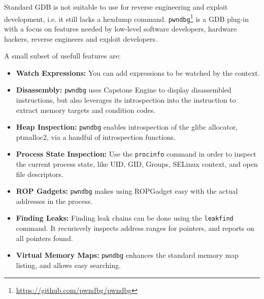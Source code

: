 \documentclass{article}
\begin{document}
Standard GDB is not suitable to use for reverse engineering and exploit development, i.e. it still lacks a hexdump 
command. \texttt{pwndbg}\footnote{\url{https://github.com/pwndbg/pwndbg}} is a GDB plug-in with a focus on features needed by low-level software developers, hardware 
hackers, reverse engineers and exploit developers. 

A small subset of usefull features are:
\begin{itemize}
\item{\textbf{Watch Expressions:}} You can add expressions to be watched by the context.
\item{\textbf{Disassembly:}} \texttt{pwndbg} uses Capstone Engine to display disassembled instructions, but also 
leverages its introspection into the instruction to extract memory targets and condition codes.
\item{\textbf{Heap Inspection:}} \texttt{pwndbg} enables introspection of the glibc allocator, ptmalloc2, via a 
handful of introspection functions.
\item{\textbf{Process State Inspection:}} Use the \texttt{procinfo} command in order to inspect the current process state, 
like UID, GID, Groups, SELinux context, and open file descriptors.
\item{\textbf{ROP Gadgets:}} \texttt{pwndbg} makes using ROPGadget easy with the actual addresses in the process.
\item{\textbf{Finding Leaks:}} Finding leak chains can be done using the \texttt{leakfind} command. It recurisvely 
inspects address ranges for pointers, and reports on all pointers found.
\item{\textbf{Virtual Memory Maps:}} \texttt{pwndbg} enhances the standard memory map listing, and allows easy searching.
\end{itemize}
\end{document}

